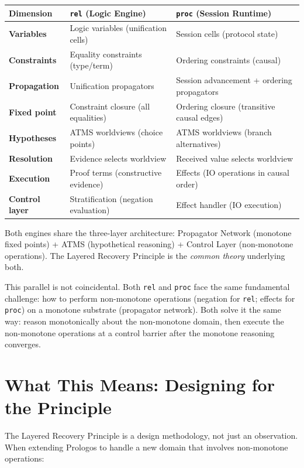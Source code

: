 \documentclass[11pt]{article}
\begin{document}
\begin{center}
\begin{tabular}{lll}
Dimension & \texttt{rel} (Logic Engine) & \texttt{proc} (Session Runtime)\\
\hline
\textbf{Variables} & Logic variables (unification cells) & Session cells (protocol state)\\
\textbf{Constraints} & Equality constraints (type/term) & Ordering constraints (causal)\\
\textbf{Propagation} & Unification propagators & Session advancement + ordering propagators\\
\textbf{Fixed point} & Constraint closure (all equalities) & Ordering closure (transitive causal edges)\\
\textbf{Hypotheses} & ATMS worldviews (choice points) & ATMS worldviews (branch alternatives)\\
\textbf{Resolution} & Evidence selects worldview & Received value selects worldview\\
\textbf{Execution} & Proof terms (constructive evidence) & Effects (IO operations in causal order)\\
\textbf{Control layer} & Stratification (negation evaluation) & Effect handler (IO execution)\\
\end{tabular}
\end{center}

Both engines share the three-layer architecture: Propagator Network (monotone
fixed points) + ATMS (hypothetical reasoning) + Control Layer (non-monotone
operations). The Layered Recovery Principle is the \emph{common theory} underlying
both.

This parallel is not coincidental. Both \texttt{rel} and \texttt{proc} face the same
fundamental challenge: how to perform non-monotone operations (negation for
\texttt{rel}; effects for \texttt{proc}) on a monotone substrate (propagator network). Both
solve it the same way: reason monotonically about the non-monotone domain, then
execute the non-monotone operations at a control barrier after the monotone
reasoning converges.
\section{What This Means: Designing for the Principle}
\label{sec:orgcd6a137}

The Layered Recovery Principle is a design methodology, not just an observation.
When extending Prologos to handle a new domain that involves non-monotone
operations:
\end{document}
